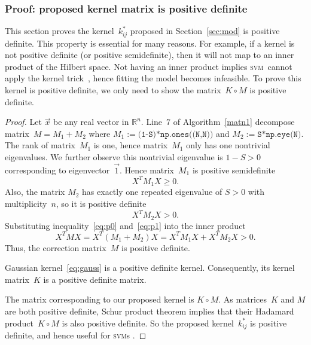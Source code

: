 \documentclass[12pt]{article} %
\newcommand{\svm}{\textsc{svm}}
\begin{document}
\subsubsection{Proof: proposed kernel matrix is positive definite} \label{sec:prove}
This section proves the kernel~$k^*_{ij}$ proposed in Section~\ref{sec:mod} is positive definite. This property is essential for many reasons. For example, if a kernel is not positive definite (or positive semidefinite), then it will not map to an inner product of the Hilbert space. Not having an inner product implies \svm\ cannot apply the kernel trick~\citep{Theodoridis:2008:PRF:1457541}, hence fitting the model becomes infeasible. To prove this kernel is positive definite, we only need to show the matrix~$K\circ M$ is positive definite.
\begin{proof}
Let $\vec x$ be any real vector in  $\mathbb{R}^n$. Line~$7$ of Algorithm~\ref{matn1} decompose matrix~$M=M_1+M_2$ where $M_1:=\texttt{(1-S)*np.ones((N,N))}$ and $M_2:=\texttt{S*np.eye(N)}$. The rank of  matrix~$M_1$ is one, hence matrix~$M_1$ only has one nontrivial eigenvalues. We further observe this nontrivial eigenvalue is $1-S>0$ corresponding to eigenvector~$\vec 1$. Hence matrix~$M_1$ is positive semidefinite
\begin{equation}\label{eq:p0}
    X^TM_1X\geq 0.
\end{equation}
Also, the matrix $M_2$ has exactly one repeated eigenvalue of $S>0$ with multiplicity~$n$, so it is positive definite
\begin{equation}\label{eq:p1}
    X^TM_2X>0.
\end{equation}
Substituting inequality~\eqref{eq:p0} and~\eqref{eq:p1} into the inner product
\begin{equation*}
    X^TMX=X^T(M_1+M_2)X=X^TM_1X+X^TM_2X>0.
\end{equation*}
Thus, the correction matrix~$M$ is positive definite.

Gaussian kernel~\eqref{eq:gauss} is a positive definite kernel. Consequently, its kernel matrix~$K$ is a positive definite matrix.

The matrix corresponding to our proposed kernel is $K\circ M$. As matrices~$K$ and $M$ are both positive definite, Schur product theorem \citep{Schur1911} implies that their Hadamard product~$K\circ M$ is also positive definite. So the proposed kernel~$k^*_{ij}$ is positive definite, and hence useful for \svm  s \citep{Theodoridis:2008:PRF:1457541}.
\end{proof}
\end{document}
